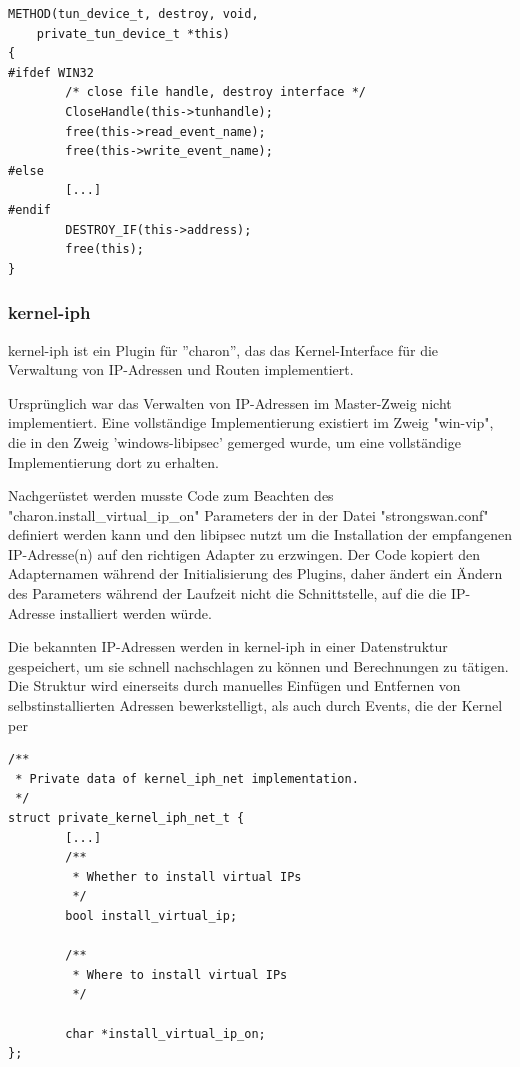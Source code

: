 \begin{lstlisting}[caption=Relevanter code für tun\_device\_t->destroy()]
METHOD(tun_device_t, destroy, void,
	private_tun_device_t *this)
{
#ifdef WIN32
        /* close file handle, destroy interface */
        CloseHandle(this->tunhandle);
        free(this->read_event_name);
        free(this->write_event_name);
#else
        [...]
#endif
    	DESTROY_IF(this->address);
    	free(this);
}
\end{lstlisting}

\subsubsection{kernel-iph}
kernel-iph ist ein Plugin für ''charon'', das das Kernel-Interface
für die Verwaltung von IP-Adressen und Routen implementiert.

Ursprünglich war das Verwalten von IP-Adressen im Master-Zweig nicht implementiert.
Eine vollständige Implementierung existiert im Zweig "win-vip", die in den Zweig 'windows-libipsec'
gemerged wurde, um eine vollständige Implementierung dort zu erhalten.

Nachgerüstet werden musste Code zum Beachten des "charon.install\_virtual\_ip\_on" Parameters
der in der Datei "strongswan.conf" definiert werden kann und den libipsec nutzt um
die Installation der empfangenen IP-Adresse(n) auf den richtigen Adapter zu erzwingen.
Der Code kopiert den Adapternamen während der Initialisierung des Plugins, daher
ändert ein Ändern des Parameters während der Laufzeit nicht die Schnittstelle,
auf die die IP-Adresse installiert werden würde.

Die bekannten IP-Adressen werden in kernel-iph in einer Datenstruktur gespeichert,
um sie schnell nachschlagen zu können und Berechnungen zu tätigen. Die Struktur
wird einerseits durch manuelles Einfügen und Entfernen von selbstinstallierten Adressen
bewerkstelligt, als auch durch Events, die der Kernel per 

\begin{lstlisting}[caption=Ergänzung zu private\_kernel\_iph\_net\_t]
/**
 * Private data of kernel_iph_net implementation.
 */
struct private_kernel_iph_net_t {
        [...]
        /**
         * Whether to install virtual IPs
         */
        bool install_virtual_ip;

        /**
         * Where to install virtual IPs
         */

        char *install_virtual_ip_on;
};
\end{lstlisting}


